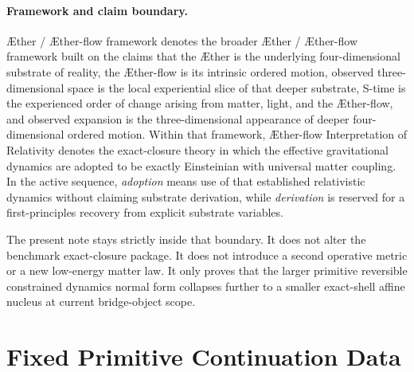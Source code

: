 \documentclass[11pt]{article}
\newcommand{\Aether}{\AE{}ther}
\newcommand{\Aflow}{\AE{}ther-flow}
\newcommand{\TheoryName}{\Aflow{} Interpretation of Relativity}
\newcommand{\TheoryProgram}{\Aether{} / \Aflow{} framework}
\begin{document}
\paragraph{Framework and claim boundary.}
\TheoryProgram{} denotes the broader \Aether{} / \Aflow{} framework built on the claims that the \Aether{} is the underlying four-dimensional substrate of reality, the \Aflow{} is its intrinsic ordered motion, observed three-dimensional space is the local experiential slice of that deeper substrate, S-time is the experienced order of change arising from matter, light, and the \Aflow{}, and observed expansion is the three-dimensional appearance of deeper four-dimensional ordered motion. Within that framework, \TheoryName{} denotes the exact-closure theory in which the effective gravitational dynamics are adopted to be exactly Einsteinian with universal matter coupling. In the active sequence, \emph{adoption} means use of that established relativistic dynamics without claiming substrate derivation, while \emph{derivation} is reserved for a first-principles recovery from explicit substrate variables.

The present note stays strictly inside that boundary. It does not alter the benchmark exact-closure package. It does not introduce a second operative metric or a new low-energy matter law. It only proves that the larger primitive reversible constrained dynamics normal form collapses further to a smaller exact-shell affine nucleus at current bridge-object scope.

\section{Fixed Primitive Continuation Data}
\end{document}

